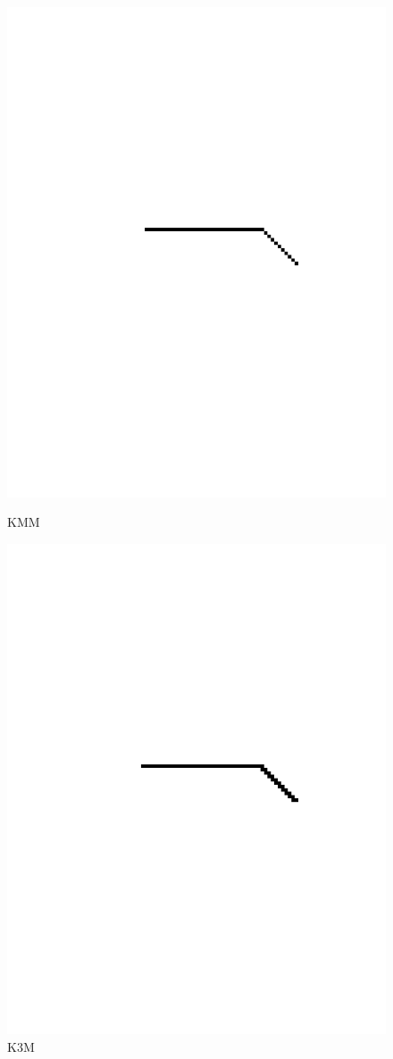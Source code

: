 \documentclass[11pt]{article}
\begin{document}
\begin{figure}[!ht]
\begin{minipage}[b]{0.5\linewidth}
    \includegraphics[width=.5\linewidth]{../samples/rect_kmm} 
    \caption{KMM} 
    \vspace{4ex}
  \end{minipage}%
  \begin{minipage}[b]{0.5\linewidth}
    \centering
    \includegraphics[width=.5\linewidth]{../samples/rect_k3m} 
    \caption{K3M} 
    \vspace{4ex}
  \end{minipage} 
\end{figure}
\FloatBarrier
\end{document}
